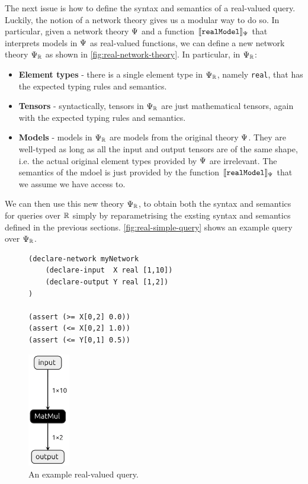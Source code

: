 The next issue is how to define the syntax and semantics of a real-valued query.
Luckily, the notion of a network theory gives us a modular way to do so. In particular, given a network theory $\Psi$ and a function $\llbracket \mathtt{realModel} \rrbracket_\Psi$ that interprets models in $\Psi$ as real-valued functions, we can define a new network theory $\Psi_{\mathbb{R}}$ as shown in \autoref{fig:real-network-theory}. In particular, in $\Psi_{\mathbb{R}}$:
\begin{itemize}
\item \textbf{Element types} - there is a single element type in $\Psi_{\mathbb{R}}$, namely \texttt{real}, that has the expected typing rules and semantics.
\item \textbf{Tensors} - syntactically, tensors in $\Psi_{\mathbb{R}}$ are just mathematical tensors, again with the expected typing rules and semantics.
\item \textbf{Models} - models in $\Psi_{\mathbb{R}}$ are models from the original theory $\Psi$. They are well-typed as long as all the input and output tensors are of the same shape, i.e. the actual original element types provided by $\Psi$ are irrelevant. The semantics of the mdoel is just provided by the function $\llbracket \mathtt{realModel} \rrbracket_\Psi$ that we assume we have access to.
\end{itemize}
We can then use this new theory $\Psi_{\mathbb{R}}$, to obtain both the syntax and semantics for queries over $\mathbb{R}$ simply by reparametrising the exsting syntax and semantics defined in the previous sections. \autoref{fig:real-simple-query} shows an example query over $\Psi_{\mathbb{R}}$.

\begin{figure}[t]
    \begin{minipage}[c]{0.62\textwidth}
        \begin{lstlisting}[style=lbnf]
(declare-network myNetwork
    (declare-input  X real [1,10])
    (declare-output Y real [1,2])
)

(assert (>= X[0,2] 0.0))
(assert (<= X[0,2] 1.0))
(assert (<= Y[0,1] 0.5))\end{lstlisting}
    \end{minipage}%
    \begin{minipage}[c]{0.35\textwidth}
        \centering
        \includegraphics[height=5cm]{imgs/simple_net.onnx.png}
    \end{minipage}
    \caption{An example real-valued \vnnlib{} query.}
    \label{fig:real-simple-query}
\end{figure}